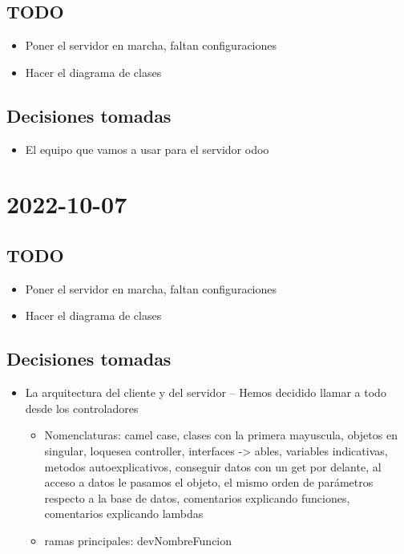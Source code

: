\documentclass[a4paper]{article}
\begin{document}
		\subsection{TODO}
			\begin{itemize}
				\item Poner el servidor en marcha, faltan configuraciones
				\item Hacer el diagrama de clases
			\end{itemize}
		\subsection{Decisiones tomadas}
			\begin{itemize}
				\item El equipo que vamos a usar para el servidor odoo
			\end{itemize}
	\section{2022-10-07}
		\subsection{TODO}
			\begin{itemize}
				\item Poner el servidor en marcha, faltan configuraciones
				\item Hacer el diagrama de clases
			\end{itemize}
		\subsection{Decisiones tomadas}
			\begin{itemize}
				\item La arquitectura del cliente y del servidor -- 
					Hemos decidido llamar a todo desde los controladores
				\begin{itemize}
					\item Nomenclaturas: camel case, clases con la primera mayuscula, objetos en singular,
						loquesea controller, interfaces -> ables, variables indicativas, metodos autoexplicativos,
						conseguir datos con un get por delante, al acceso a datos le pasamos el objeto,
						el mismo orden de parámetros respecto a la base de datos, comentarios explicando funciones,
						comentarios explicando lambdas
					\item ramas principales: devNombreFuncion
				\end{itemize}
			\end{itemize}
\end{document}
